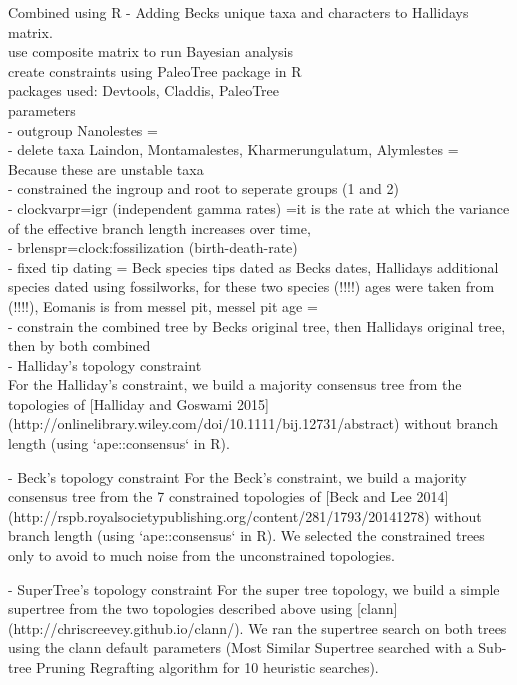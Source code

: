 \documentclass[a4paper,11pt]{article}
\begin{document}
Combined using R - Adding Becks unique taxa and characters to Hallidays matrix. \\ 

use composite matrix to run Bayesian analysis\\
create constraints using PaleoTree package in R\\
packages used: Devtools, Claddis, PaleoTree \\

parameters\\
 - outgroup Nanolestes =\\
 - delete taxa Laindon, Montamalestes, Kharmerungulatum, Alymlestes = Because these are unstable taxa\\
 - constrained the ingroup and root to seperate groups (1 and 2)\\
 - clockvarpr=igr (independent gamma rates) =it is the rate at which the variance of the effective branch length increases over time,\\
 - brlenspr=clock:fossilization (birth-death-rate)\\
 - fixed tip dating = Beck species tips dated as Becks dates, Hallidays additional species dated using fossilworks, for these two species (!!!!) ages were taken from (!!!!), Eomanis is from messel pit, messel pit age =  \\
 - constrain the combined tree by Becks original tree, then Hallidays original tree, then by both combined\\

 - Halliday's topology constraint\\
For the Halliday's constraint, we build a majority consensus tree from the topologies of [Halliday and Goswami 2015]\\ (http://onlinelibrary.wiley.com/doi/10.1111/bij.12731/abstract) without branch length (using `ape::consensus` in R).

 - Beck's topology constraint
For the Beck's constraint, we build a majority consensus tree from the 7 constrained topologies of [Beck and Lee 2014]\\ (http://rspb.royalsocietypublishing.org/content/281/1793/20141278) without branch length (using `ape::consensus` in R).
We selected the constrained trees only to avoid to much noise from the unconstrained topologies.

 - SuperTree's topology constraint
For the super tree topology, we build a simple supertree from the two topologies described above using [clann](http://chriscreevey.github.io/clann/).
We ran the supertree search on both trees using the clann default parameters (Most Similar Supertree searched with a Sub-tree Pruning Regrafting algorithm for 10 heuristic searches).
\end{document}
